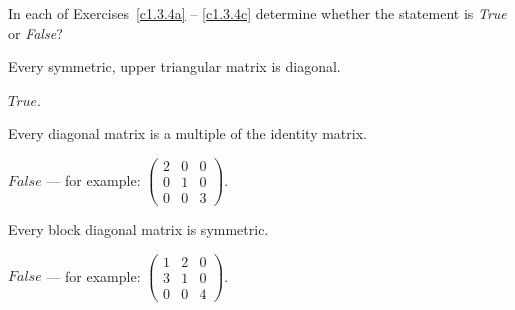 \documentclass{ximera}
\begin{document}
\noindent In each of Exercises~\ref{c1.3.4a} -- \ref{c1.3.4c} determine
whether the statement is {\em True\/} or {\em False\/}?
\begin{exercise} \label{c1.3.4a}
  Every symmetric, upper triangular matrix is diagonal.

\begin{solution}
\ans $True$.

\end{solution}
\end{exercise}

\begin{exercise} \label{c1.3.4b}
  Every diagonal matrix is a multiple of the identity matrix.

\begin{solution}
\ans $False$ --- for example:
$\left(\begin{array}{ccc}
2 & 0 & 0 \\
0 & 1 & 0 \\
0 & 0 & 3 \end{array}\right)$.

\end{solution}
\end{exercise}

\begin{exercise} \label{c1.3.4c}
  Every block diagonal matrix is symmetric.

\begin{solution}
\ans $False$ --- for example:
$\left(\begin{array}{ccc}
1 & 2 & 0 \\
3 & 1 & 0 \\
0 & 0 & 4
\end{array}\right)$.

\end{solution}
\end{exercise}
\end{document}

